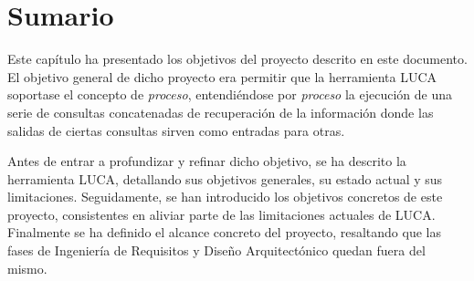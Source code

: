 \section{Sumario}

Este capítulo ha presentado los objetivos del proyecto descrito en este documento. El objetivo general de dicho proyecto era permitir que la herramienta LUCA soportase el concepto de \emph{proceso}, entendiéndose por \emph{proceso} la ejecución de una serie de consultas concatenadas de recuperación de la información donde las salidas de ciertas consultas sirven como entradas para otras. 

Antes de entrar a profundizar y refinar dicho objetivo, se ha descrito la herramienta LUCA, detallando sus objetivos generales, su estado actual y sus limitaciones. Seguidamente, se han introducido los objetivos concretos de este proyecto, consistentes en aliviar parte de las limitaciones actuales de LUCA. Finalmente se ha definido el alcance concreto del proyecto, resaltando que las fases de Ingeniería de Requisitos y Diseño Arquitectónico quedan fuera del mismo.